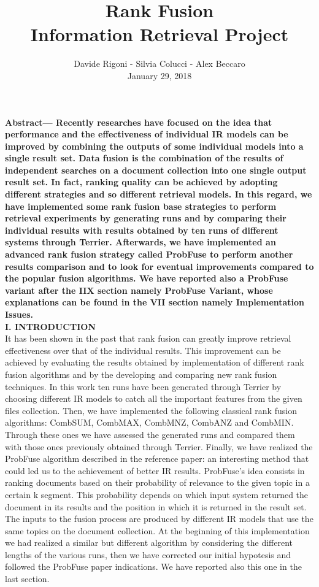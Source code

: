 \documentclass[12pt,journal]{IEEEtran}
\title{Rank Fusion \\ {\huge Information Retrieval Project}}
\author{Davide Rigoni - Silvia Colucci - Alex Beccaro \\ January 29, 2018}
\begin{document}
	\maketitle
	\textbf {Abstract— Recently researches have focused on the idea that performance and the effectiveness of individual IR models can be improved by combining the outputs of some individual models into a single result set. Data fusion is the combination of the results of independent searches on a document collection into one single output result set. In fact, ranking quality can be achieved by adopting different strategies and so different retrieval models.
In this regard, we have implemented some rank fusion base strategies to perform retrieval experiments by generating runs and by comparing their individual results with results obtained by ten runs of different systems through Terrier.
Afterwards, we have implemented an advanced rank fusion strategy called ProbFuse to perform another results comparison and to look for eventual improvements compared to the popular fusion algorithms. We have reported also a ProbFuse variant after the IIX section namely ProbFuse Variant, whose explanations can be found in the VII section namely Implementation Issues.} \\

\textbf{I. INTRODUCTION} \\
It has been shown in the past that rank fusion can greatly improve retrieval effectiveness over that of the individual results.
This improvement can be achieved by evaluating the results obtained by implementation of different rank fusion algorithms and by the developing and comparing new rank fusion techniques.
In this work ten runs have been generated through Terrier by choosing different IR models to catch all the important features from the given files collection. Then, we have implemented the following classical rank fusion algorithms: CombSUM, CombMAX, CombMNZ, CombANZ and CombMIN. Through these ones we have assessed the generated runs and compared them with those ones previously obtained through Terrier. 
Finally, we have realized the ProbFuse algorithm described in the reference paper: an interesting method that could led us to the achievement of better IR results.
ProbFuse’s idea consists in ranking documents based on their probability of relevance to the given topic in a certain k segment. This probability depends on which input system returned the document in its results and the position in which it is returned in the result set. 
The inputs to the fusion process are produced by different IR models that use the same topics on the document collection. At the beginning of this implementation we had realized a similar but different algorithm by considering the different lengths of the various runs, then we have corrected our initial hypotesis and followed the ProbFuse paper indications. We have reported also this one in the last section.\\
\end{document}
